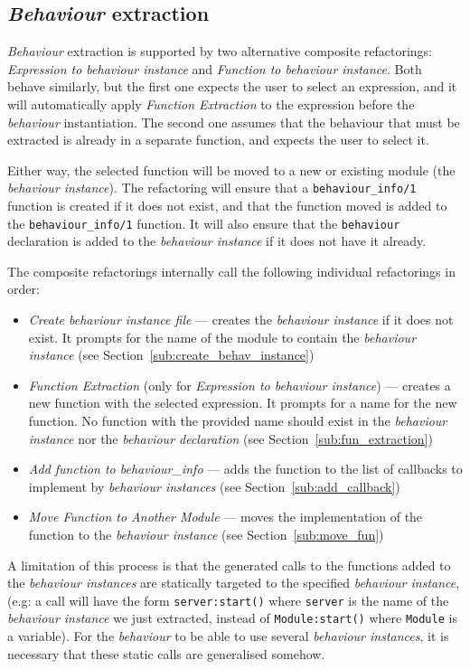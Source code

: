 \subsection{\emph{Behaviour} extraction\label{sec:behaviour-extraction}}

\emph{Behaviour} extraction is supported by two alternative composite
refactorings: \emph{Expression to behaviour instance} and \emph{Function
to behaviour instance}. Both behave similarly, but the first one expects
the user to select an expression, and it will automatically apply
\emph{Function Extraction} to the expression before the \emph{behaviour}
instantiation. The second one assumes that the behaviour that must
be extracted is already in a separate function, and expects the user
to select it.

Either way, the selected function will be moved to a new or existing
module (the \emph{behaviour instance}). The refactoring will ensure
that a \texttt{behaviour\_info/1} function is created if it does not
exist, and that the function moved is added to the \texttt{behaviour\_info/1}
function. It will also ensure that the \texttt{behaviour} declaration
is added to the \emph{behaviour instance} if it does not have it already. 

The composite refactorings internally call the following individual
refactorings in order:
\begin{itemize}
\item \emph{Create behaviour instance file} --- creates the \emph{behaviour
instance} if it does not exist. It prompts for the name of the module
to contain the \emph{behaviour instance} (see Section~\ref{sub:create_behav_instance})
\item \emph{Function Extraction} (only for \emph{Expression to behaviour
instance}) --- creates a new function with the selected expression.
It prompts for a name for the new function. No function with the provided
name should exist in the \emph{behaviour instance} nor the \emph{behaviour
declaration} (see Section~\ref{sub:fun_extraction})
\item \emph{Add function to behaviour\_info} --- adds the function to the
list of callbacks to implement by \emph{behaviour instances} (see
Section~\ref{sub:add_callback})
\item \emph{Move Function to Another Module} --- moves the implementation
of the function to the \emph{behaviour instance} (see Section~\ref{sub:move_fun})
\end{itemize}
A limitation of this process is that the generated calls to the functions
added to the \emph{behaviour instances} are statically targeted to
the specified \emph{behaviour instance}, (e.g: a call will have the
form \texttt{server:start()} where \texttt{server} is the name of
the \emph{behaviour instance} we just extracted, instead of \texttt{Module:start()}
where \texttt{Module} is a variable). For the \emph{behaviour} to
be able to use several \emph{behaviour instances}, it is necessary
that these static calls are generalised somehow.

